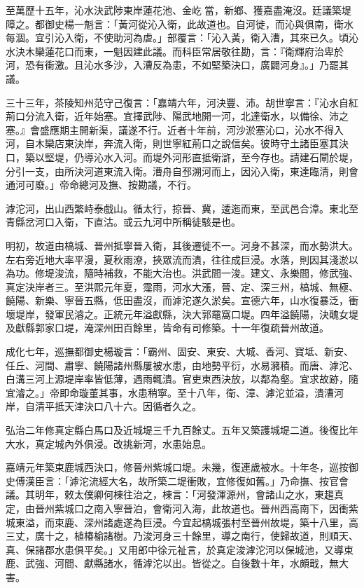 至萬歷十五年，沁水決武陟東岸蓮花池、金屹當，新鄉、獲嘉盡淹沒。廷議築堤障之。都御史楊一魁言：「黃河從沁入衛，此故道也。自河徙，而沁與俱南，衛水每涸。宜引沁入衛，不使助河為虐。」部覆言：「沁入黃，衛入漕，其來已久。頃沁水決木欒蓮花口而東，一魁因建此議。而科臣常居敬往勘，言：『衛輝府治卑於河，恐有衝激。且沁水多沙，入漕反為患，不如堅築決口，廣闢河身』。」乃罷其議。

三十三年，茶陵知州范守己復言：「嘉靖六年，河決豐、沛。胡世寧言：『沁水自紅荊口分流入衛，近年始塞。宜擇武陟、陽武地開一河，北達衛水，以備徐、沛之塞。』會盛應期主開新渠，議遂不行。近者十年前，河沙淤塞沁口，沁水不得入河，自木欒店東決岸，奔流入衛，則世寧紅荊口之說信矣。彼時守土諸臣塞其決口，築以堅堤，仍導沁水入河。而堤外河形直抵衛滸，至今存也。請建石閘於堤，分引一支，由所決河道東流入衛。漕舟自邳溯河而上，因沁入衛，東達臨清，則會通河可廢。」帝命總河及撫、按勘議，不行。

滹沱河，出山西繁峙泰戲山。循太行，掠晉、冀，逶迤而東，至武邑合漳。東北至青縣岔河口入衛，下直沽。或云九河中所稱徒駭是也。

明初，故道由槁城、晉州抵寧晉入衛，其後遷徙不一。河身不甚深，而水勢洪大。左右旁近地大率平漫，夏秋雨潦，挾眾流而潰，往往成巨浸。水落，則因其淺淤以為功。修堤浚流，隨時補救，不能大治也。洪武間一浚。建文、永樂間，修武強、真定決岸者三。至洪熙元年夏，霪雨，河水大漲，晉、定、深三州，槁城、無極、饒陽、新樂、寧晉五縣，低田盡沒，而滹沱遂久淤矣。宣德六年，山水復暴泛，衝壞堤岸，發軍民濬之。正統元年溢獻縣，決大郭黿窩口堤。四年溢饒陽，決醜女堤及獻縣郭家口堤，淹深州田百餘里，皆命有司修築。十一年復疏晉州故道。

成化七年，巡撫都御史楊璇言：「霸州、固安、東安、大城、香河、寶坻、新安、任丘、河間、肅寧、饒陽諸州縣屢被水患，由地勢平衍，水易瀦積。而唐、滹沱、白溝三河上源堤岸率皆低薄，遇雨輒潰。官吏東西決放，以鄰為壑。宜求故跡，隨宜濬之。」帝即命璇董其事，水患稍寧。至十八年，衛、漳、滹沱並溢，潰漕河岸，自清平抵天津決口八十六。因循者久之。

弘治二年修真定縣白馬口及近城堤三千九百餘丈。五年又築護城堤二道。後復比年大水，真定城內外俱浸。改挑新河，水患始息。

嘉靖元年築束鹿城西決口，修晉州紫城口堤。未幾，復連歲被水。十年冬，巡按御史傅漢臣言：「滹沱流經大名，故所築二堤衝敗，宜修復如舊。」乃命撫、按官會議。其明年，敕太僕卿何棟往治之，棟言：「河發渾源州，會諸山之水，東趨真定，由晉州紫城口之南入寧晉泊，會衛河入海，此故道也。晉州西高南下，因衝紫城東溢，而束鹿、深州諸處遂為巨浸。今宜起槁城張村至晉州故堤，築十八里，高三丈，廣十之，植椿榆諸樹。乃浚河身三十餘里，導之南行，使歸故道，則順天、真、保諸郡水患俱平矣。」又用郎中徐元祉言，於真定浚滹沱河以保城池，又導束鹿、武強、河間、獻縣諸水，循滹沱以出。皆從之。自後數十年，水頗戢，無大害。

